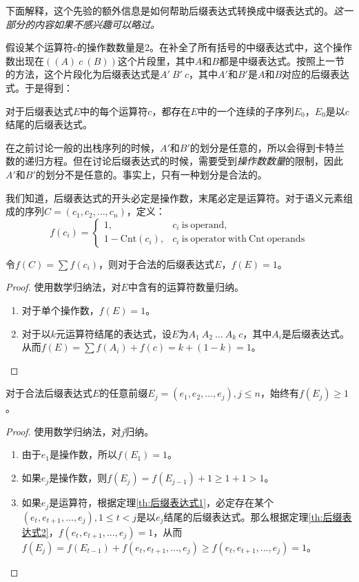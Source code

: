 下面解释，这个先验的额外信息是如何帮助后缀表达式转换成中缀表达式的。\textit{这一部分的内容如果不感兴趣可以略过。}

假设某个运算符$c$的操作数数量是2。在补全了所有括号的中缀表达式中，这个操作数出现在$((A)\ c\ (B))$这个片段里，其中$A$和$B$都是中缀表达式。按照上一节的方法，这个片段化为后缀表达式是$A'\ B'\ c$，其中$A'$和$B'$是$A$和$B$对应的后缀表达式。于是得到：

\begin{theorem}\label{th:后缀表达式1}
对于后缀表达式$E$中的每个运算符$c$，都存在$E$中的一个连续的子序列$E_0$，$E_0$是以$c$结尾的后缀表达式。
\end{theorem}

在之前讨论一般的出栈序列的时候，$A'$和$B'$的划分是任意的，所以会得到卡特兰数的递归方程。但在讨论后缀表达式的时候，需要受到\textit{操作数数量}的限制，因此$A'$和$B'$的划分不是任意的。事实上，只有一种划分是合法的。

我们知道，后缀表达式的开头必定是操作数，末尾必定是运算符。对于语义元素组成的序列$C=(c_1,c_2,\dots,c_n)$，定义：
$$
f(c_i)=\begin{cases}
1,&c_i\mathrm{\ is\ operand},\\
1-\mathrm{Cnt}(c_i),&c_i\mathrm{\ is\ operator\ with\ Cnt\ operands}
\end{cases}
$$

\begin{theorem}\label{th:后缀表达式2}
令$f(C)=\sum f(c_i)$，则对于合法的后缀表达式$E$，$f(E)=1$。
\end{theorem}

\begin{proof}
使用数学归纳法，对$E$中含有的运算符数量归纳。

\begin{enumerate}
    \item 对于单个操作数，$f(E)=1$。
    \item 对于以$k$元运算符结尾的表达式，设$E$为$A_1\ A_2\ \dots \ A_k\ c$，其中$A_i$是后缀表达式。从而$f(E) = \sum f(A_i) + f(c) = k + (1-k) = 1$。
\end{enumerate}
\end{proof}
\begin{theorem}\label{th:后缀表达式3}
对于合法后缀表达式$E$的任意前缀$E_j=(e_1,e_2,\dots,e_j),j\le n$，始终有$f(E_j)\ge 1$。
\end{theorem}

\begin{proof}
使用数学归纳法，对$j$归纳。

\begin{enumerate}
    \item 由于$e_1$是操作数，所以$f(E_1)=1$。
    \item 如果$e_j$是操作数，则$f(E_j)=f(E_{j-1})+1\ge 1+1>1$。
    \item 如果$e_j$是运算符，根据定理\ref{th:后缀表达式1}，必定存在某个$(e_t,e_{t+1},\dots,e_j),1\le t<j$是以$e_j$结尾的后缀表达式。那么根据定理\ref{th:后缀表达式2}，$f(e_t,e_{t+1},\dots,e_j)=1$，从而$f(E_j)=f(E_{t-1}) + f(e_t,e_{t+1},\dots,e_j)\ge f(e_t,e_{t+1},\dots,e_j)=1$。
\end{enumerate}
\end{proof}

